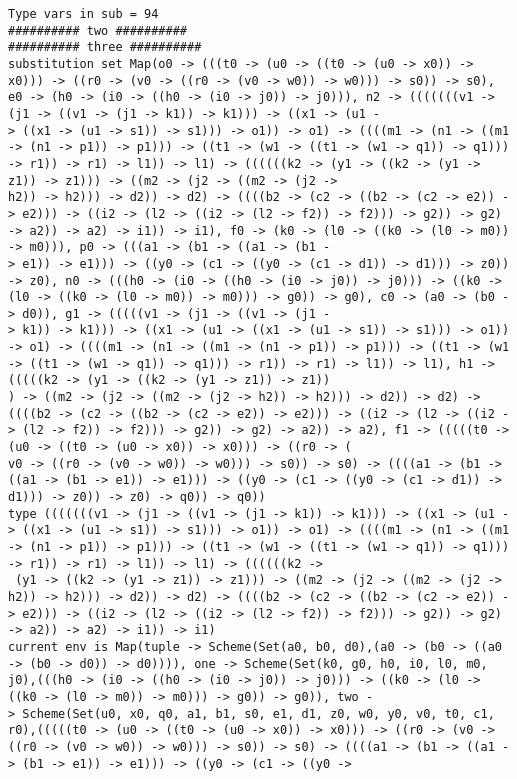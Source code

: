 \documentclass[11pt,oneside,a4paper]{report}
\begin{document}
\begin{lstlisting}[breaklines=true,caption={The output of an exponential type},label=lst:appedix:bigexp]
Type vars in sub = 94
########## two ##########
########## three ##########
substitution set Map(o0 -> (((t0 -> (u0 -> ((t0 -> (u0 -> x0)) -> x0))) -> ((r0 -> (v0 -> ((r0 -> (v0 -> w0)) -> w0))) -> s0)) -> s0), e0 -> (h0 -> (i0 -> ((h0 -> (i0 -> j0)) -> j0))), n2 -> (((((((v1 -> (j1 -> ((v1 -> (j1 -> k1)) -> k1))) -> ((x1 -> (u1 -
> ((x1 -> (u1 -> s1)) -> s1))) -> o1)) -> o1) -> ((((m1 -> (n1 -> ((m1 -> (n1 -> p1)) -> p1))) -> ((t1 -> (w1 -> ((t1 -> (w1 -> q1)) -> q1))) -> r1)) -> r1) -> l1)) -> l1) -> ((((((k2 -> (y1 -> ((k2 -> (y1 -> z1)) -> z1))) -> ((m2 -> (j2 -> ((m2 -> (j2 ->
h2)) -> h2))) -> d2)) -> d2) -> ((((b2 -> (c2 -> ((b2 -> (c2 -> e2)) -> e2))) -> ((i2 -> (l2 -> ((i2 -> (l2 -> f2)) -> f2))) -> g2)) -> g2) -> a2)) -> a2) -> i1)) -> i1), f0 -> (k0 -> (l0 -> ((k0 -> (l0 -> m0)) -> m0))), p0 -> (((a1 -> (b1 -> ((a1 -> (b1 -
> e1)) -> e1))) -> ((y0 -> (c1 -> ((y0 -> (c1 -> d1)) -> d1))) -> z0)) -> z0), n0 -> (((h0 -> (i0 -> ((h0 -> (i0 -> j0)) -> j0))) -> ((k0 -> (l0 -> ((k0 -> (l0 -> m0)) -> m0))) -> g0)) -> g0), c0 -> (a0 -> (b0 -> d0)), g1 -> (((((v1 -> (j1 -> ((v1 -> (j1 -
> k1)) -> k1))) -> ((x1 -> (u1 -> ((x1 -> (u1 -> s1)) -> s1))) -> o1)) -> o1) -> ((((m1 -> (n1 -> ((m1 -> (n1 -> p1)) -> p1))) -> ((t1 -> (w1 -> ((t1 -> (w1 -> q1)) -> q1))) -> r1)) -> r1) -> l1)) -> l1), h1 -> (((((k2 -> (y1 -> ((k2 -> (y1 -> z1)) -> z1))
) -> ((m2 -> (j2 -> ((m2 -> (j2 -> h2)) -> h2))) -> d2)) -> d2) -> ((((b2 -> (c2 -> ((b2 -> (c2 -> e2)) -> e2))) -> ((i2 -> (l2 -> ((i2 -> (l2 -> f2)) -> f2))) -> g2)) -> g2) -> a2)) -> a2), f1 -> (((((t0 -> (u0 -> ((t0 -> (u0 -> x0)) -> x0))) -> ((r0 -> (
v0 -> ((r0 -> (v0 -> w0)) -> w0))) -> s0)) -> s0) -> ((((a1 -> (b1 -> ((a1 -> (b1 -> e1)) -> e1))) -> ((y0 -> (c1 -> ((y0 -> (c1 -> d1)) -> d1))) -> z0)) -> z0) -> q0)) -> q0))
type (((((((v1 -> (j1 -> ((v1 -> (j1 -> k1)) -> k1))) -> ((x1 -> (u1 -> ((x1 -> (u1 -> s1)) -> s1))) -> o1)) -> o1) -> ((((m1 -> (n1 -> ((m1 -> (n1 -> p1)) -> p1))) -> ((t1 -> (w1 -> ((t1 -> (w1 -> q1)) -> q1))) -> r1)) -> r1) -> l1)) -> l1) -> ((((((k2 ->
 (y1 -> ((k2 -> (y1 -> z1)) -> z1))) -> ((m2 -> (j2 -> ((m2 -> (j2 -> h2)) -> h2))) -> d2)) -> d2) -> ((((b2 -> (c2 -> ((b2 -> (c2 -> e2)) -> e2))) -> ((i2 -> (l2 -> ((i2 -> (l2 -> f2)) -> f2))) -> g2)) -> g2) -> a2)) -> a2) -> i1)) -> i1)
current env is Map(tuple -> Scheme(Set(a0, b0, d0),(a0 -> (b0 -> ((a0 -> (b0 -> d0)) -> d0)))), one -> Scheme(Set(k0, g0, h0, i0, l0, m0, j0),(((h0 -> (i0 -> ((h0 -> (i0 -> j0)) -> j0))) -> ((k0 -> (l0 -> ((k0 -> (l0 -> m0)) -> m0))) -> g0)) -> g0)), two -
> Scheme(Set(u0, x0, q0, a1, b1, s0, e1, d1, z0, w0, y0, v0, t0, c1, r0),(((((t0 -> (u0 -> ((t0 -> (u0 -> x0)) -> x0))) -> ((r0 -> (v0 -> ((r0 -> (v0 -> w0)) -> w0))) -> s0)) -> s0) -> ((((a1 -> (b1 -> ((a1 -> (b1 -> e1)) -> e1))) -> ((y0 -> (c1 -> ((y0 ->

\end{lstlisting}
\end{document}
